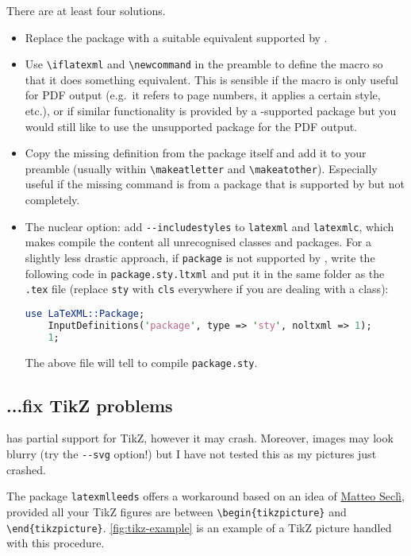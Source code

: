 \documentclass[a4paper]{article}
\def\ltxinline{\lstinline[style=latexml,frame=none]}
\theoremstyle{definition}
\begin{document}
There are at least four solutions.
\begin{itemize}
  \item Replace the package with a suitable equivalent supported by \LaTeXML{}.
  \item Use \ltxinline|\iflatexml| and \ltxinline|\newcommand| in the preamble to define the macro so that it does something equivalent. This is sensible if the macro is only useful for PDF output (e.g.\ it refers to page numbers, it applies a certain style, etc.), or if similar functionality is provided by a \LaTeXML{}-supported package but you would still like to use the unsupported package for the PDF output.
  \item Copy the missing definition from the package itself and add it to your preamble (usually within \ltxinline|\makeatletter| and \ltxinline|\makeatother|). Especially useful if the missing command is from a package that is supported by \LaTeXML{} but not completely.
  \item The nuclear option: add \verb|--includestyles| to \verb|latexml| and \verb|latexmlc|, which makes \LaTeXML{} compile the content all unrecognised classes and packages. For a slightly less drastic approach, if \verb|package| is not supported by \LaTeXML{}, write the following code in \verb|package.sty.ltxml| and put it in the same folder as the \verb|.tex| file (replace \verb|sty| with \verb|cls| everywhere if you are dealing with a class):
  \begin{lstlisting}[language=Perl]
    use LaTeXML::Package;
    InputDefinitions('package', type => 'sty', noltxml => 1);
    1;
  \end{lstlisting}
  The above file will tell \LaTeXML{} to compile \verb|package.sty|.
\end{itemize}

\subsection{...fix TikZ problems}
\label{sub:tikz-howto}
\LaTeXML{} has partial support for TikZ, however it may crash. Moreover, images may look blurry (try the \verb|--svg| option!) but I have not tested this as my pictures just crashed.

The package \verb|latexmlleeds| offers a workaround based on an idea of \href{https://github.com/brucemiller/LaTeXML/issues/945}{Matteo Seclì}, provided all your TikZ figures are between \ltxinline|\begin{tikzpicture}| and \ltxinline|\end{tikzpicture}|. \autoref{fig:tikz-example} is an example of a TikZ picture handled with this procedure.
\end{document}
